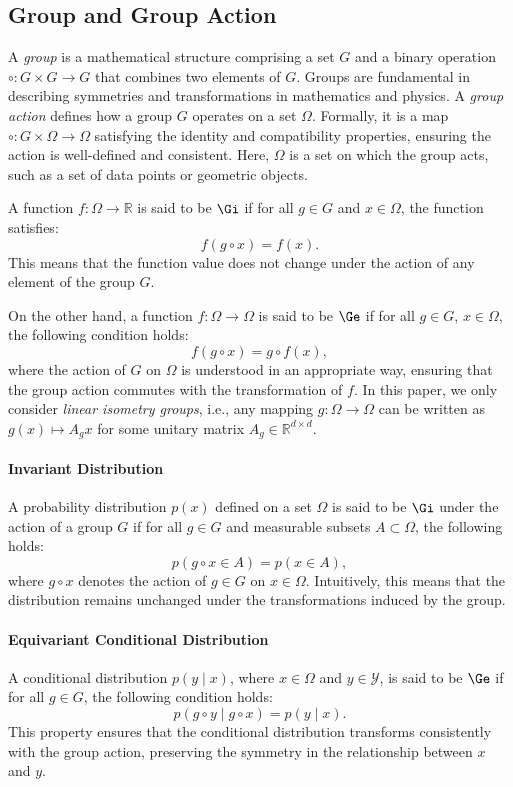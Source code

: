 \subsection{Group and Group Action}

A \emph{group} is a mathematical structure comprising a set \( G \) and a binary operation \( \circ : G \times G \to G \) that combines two elements of \( G \). Groups are fundamental in describing symmetries and transformations in mathematics and physics. A \emph{group action} defines how a group \( G \) operates on a set \( \Omega \). Formally, it is a map \( \circ : G \times \Omega \to \Omega \) satisfying the identity and compatibility properties, ensuring the action is well-defined and consistent. Here, \( \Omega \) is a set on which the group acts, such as a set of data points or geometric objects.


A function \( f : \Omega \to \mathbb{R} \) is said to be \(\Gi\) if for all \( g \in G \) and \( x \in \Omega \), the function satisfies:
\[
f(g \circ x) = f(x).
\]
This means that the function value does not change under the action of any element of the group \( G \).

On the other hand, a function \( f : \Omega \to \Omega \) is said to be \(\Ge\) if for all \( g \in G \), \( x \in \Omega \), the following condition holds:
\[
f(g \circ x) = g \circ f(x),
\]
where the action of \( G \) on \( \Omega \) is understood in an appropriate way, ensuring that the group action commutes with the transformation of \( f \). In this paper, we only consider \textit{linear isometry groups}, i.e., any mapping \( g : \Omega \to \Omega \) can be written as \( g(x) \mapsto A_gx \) for some unitary matrix $A_g \in \mathbb{R}^{d \times d}$. 

\paragraph{Invariant Distribution} 
A probability distribution \( p(x) \) defined on a set \( \Omega \) is said to be \(\Gi\) under the action of a group \( G \) if for all \( g \in G \) and measurable subsets \( A \subset \Omega \), the following holds:
\[
p(g \circ x \in A) = p(x \in A),
\]
where \( g \circ x \) denotes the action of \( g \in G \) on \( x \in \Omega \). Intuitively, this means that the distribution remains unchanged under the transformations induced by the group.

\paragraph{Equivariant Conditional Distribution} 
A conditional distribution \( p(y \mid x) \), where \( x \in \Omega \) and \( y \in \mathcal{Y} \), is said to be \(\Ge\) if for all \( g \in G \), the following condition holds:
\[
p(g \circ y \mid g \circ x) = p(y \mid x).
\]
This property ensures that the conditional distribution transforms consistently with the group action, preserving the symmetry in the relationship between \( x \) and \( y \).

